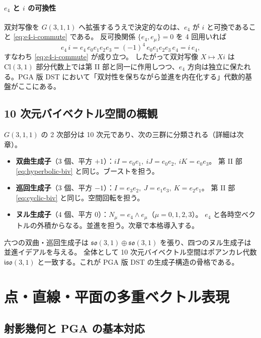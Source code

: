 \documentclass[dvipdfmx,a4paper,oneside]{jsbook}
\numberwithin{equation}{chapter}
\begin{document}
\paragraph{\(e_4\) と \(i\) の可換性}
双対写像を \(G(3,1,1)\) へ拡張するうえで決定的なのは、\(e_4\) が \(i\) と可換であること \eqref{eq:e4-i-commute} である。
反可換関係 \(\{e_4, e_\mu\} = 0\) を 4 回用いれば
\begin{equation}
  e_4\, i
  = e_4\, e_0 e_1 e_2 e_3
  = (-1)^4\, e_0 e_1 e_2 e_3\, e_4
  = i\, e_4,
\end{equation}
すなわち \eqref{eq:e4-i-commute} が成り立つ。
したがって双対写像 \(X \mapsto Xi\) は \(\mathrm{Cl}(3,1)\) 部分代数上では第 II 部と同一に作用しつつ、\(e_4\) 方向は独立に保たれる。PGA 版 DST において「双対性を保ちながら並進を内在化する」代数的基盤がここにある。

\subsection{10 次元バイベクトル空間の概観}

\(G(3,1,1)\) の 2 次部分は 10 次元であり、次の三群に分類される（詳細は次章）。

\begin{itemize}[leftmargin=2em]
  \item \textbf{双曲生成子}（3 個、平方 \(+1\)）：\(iI = e_0 e_1,\ iJ = e_0 e_2,\ iK = e_0 e_3\)。
  第 II 部 \eqref{eq:hyperbolic-biv} と同じ。ブーストを担う。
  \item \textbf{巡回生成子}（3 個、平方 \(-1\)）：\(I = e_3 e_2,\ J = e_1 e_3,\ K = e_2 e_1\)。
  第 II 部 \eqref{eq:cyclic-biv} と同じ。空間回転を担う。
  \item \textbf{ヌル生成子}（4 個、平方 \(0\)）：\(N_\mu = e_4 \wedge e_\mu\)（\(\mu = 0,1,2,3\)）。
  \(e_4\) と各時空ベクトルの外積からなる。並進を担う。次章で本格導入する。
\end{itemize}

六つの双曲・巡回生成子は \(\mathfrak{so}(3,1) \oplus \mathfrak{so}(3,1)\) を張り、四つのヌル生成子は並進イデアルを与える。
全体として 10 次元バイベクトル空間はポアンカレ代数 \(\mathfrak{iso}(3,1)\) と一致する。これが PGA 版 DST の生成子構造の骨格である。

\section{点・直線・平面の多重ベクトル表現}

\subsection{射影幾何と PGA の基本対応}
\end{document}
